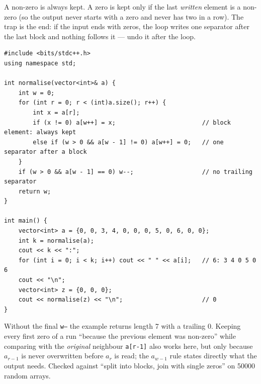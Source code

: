 \begin{solutionbox}
A non-zero is always kept. A zero is kept only if the last \emph{written} element is a non-zero (so the output never starts with a zero and never has two in a row). The trap is the end: if the input ends with zeros, the loop writes one separator after the last block and nothing follows it --- undo it after the loop.
\begin{lstlisting}[style=cpp]
#include <bits/stdc++.h>
using namespace std;

int normalise(vector<int>& a) {
    int w = 0;
    for (int r = 0; r < (int)a.size(); r++) {
        int x = a[r];
        if (x != 0) a[w++] = x;                        // block element: always kept
        else if (w > 0 && a[w - 1] != 0) a[w++] = 0;   // one separator after a block
    }
    if (w > 0 && a[w - 1] == 0) w--;                   // no trailing separator
    return w;
}

int main() {
    vector<int> a = {0, 0, 3, 4, 0, 0, 0, 5, 0, 6, 0, 0};
    int k = normalise(a);
    cout << k << ":";
    for (int i = 0; i < k; i++) cout << " " << a[i];   // 6: 3 4 0 5 0 6
    cout << "\n";
    vector<int> z = {0, 0, 0};
    cout << normalise(z) << "\n";                      // 0
}
\end{lstlisting}
\begin{center}
\end{center}
Without the final \texttt{w--} the example returns length 7 with a trailing 0. Keeping every first zero of a run ``because the previous element was non-zero'' while comparing with the \emph{original} neighbour \texttt{a[r-1]} also works here, but only because $a_{r-1}$ is never overwritten before $a_r$ is read; the $a_{w-1}$ rule states directly what the output needs. Checked against ``split into blocks, join with single zeros'' on 50000 random arrays.
\end{solutionbox}

